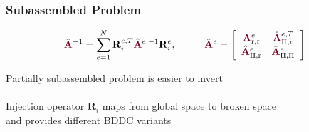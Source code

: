 \documentclass{beamer}
\begin{document}
\begin{frame}
\begin{center}
\frametitle{Subassembled Problem}

\begin{equation}
\hat{\color{burgundy}\mathbf{A}}^{-1} = \sum_{e = 1}^N \mathbf{R}^{e, T}_i \hat{\color{burgundy}\mathbf{A}}^{e, -1} \mathbf{R}^e_i, \hspace{10mm}
\hat{\color{burgundy}\mathbf{A}}^e =
\left[ \begin{array}{c c}
{\color{burgundy}\mathbf{A}}_{\text{r}, \text{r}}^e  &  \hat{\color{burgundy}\mathbf{A}}_{\Pi, \text{r}}^{e, T}  \\
\hat{\color{burgundy}\mathbf{A}}_{\Pi, \text{r}}^e   &  \hat{\color{burgundy}\mathbf{A}}_{\Pi, \Pi}^e            \\
\end{array} \right]
\end{equation}

Partially subassembled problem is easier to invert\\

~\\

Injection operator $\mathbf{R}_i$ maps from global space to broken space\\and provides different BDDC variants

\end{center}
\end{frame}

\end{document}
